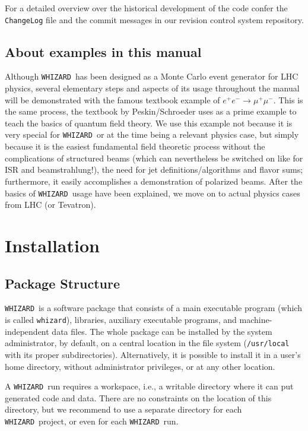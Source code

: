 \documentclass[12pt]{book}
\newcommand{\ttt}[1]{\texttt{#1}}
\newcommand{\whizard}{\texttt{WHIZARD}}
\begin{document}
\vspace{.5cm}

For a detailed overview over the historical development of the code
confer the \ttt{ChangeLog} file and the commit messages in our
revision control system repository. 


\section{About examples in this manual}

Although \whizard\ has been designed as a Monte Carlo event generator
for LHC physics, several elementary steps and aspects of its usage
throughout the manual will be demonstrated with the famous textbook
example of $e^+e^- \to \mu^+ \mu^-$. This is the same process, the
textbook by Peskin/Schroeder \cite{PeskinSchroeder} uses as a prime
example to teach the basics of quantum field theory. We use this
example not because it is very special for \whizard\ or at the time
being a relevant physics case, but simply because it is the easiest
fundamental field theoretic process without the complications of
structured beams (which can nevertheless be switched on like for ISR
and beamstrahlung!), the need for jet definitions/algorithms and
flavor sums; furthermore, it easily accomplishes a demonstration of
polarized beams. After the basics of \whizard\ usage have been
explained, we move on to actual physics cases from LHC (or Tevatron). 


\newpage
\chapter{Installation}
\label{chap:installation}

\section{Package Structure}

\whizard\ is a software package that consists of a main executable
program (which is called \ttt{whizard}), libraries, auxiliary
executable programs, and machine-independent data files.  The whole
package can be installed by the system administrator, by default, on a
central location in the file system (\ttt{/usr/local} with its proper
subdirectories).  Alternatively, it is possible to install it in a
user's home directory, without administrator privileges, or at any
other location.

A \whizard\ run requires a workspace, i.e., a writable directory where
it can put generated code and data.  There are no constraints on the
location of this directory, but we recommend to use a separate
directory for each \whizard\ project, or even for each \whizard\ run.
\end{document}
